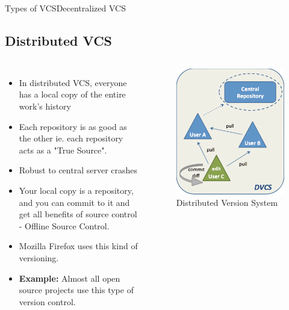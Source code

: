 \documentclass{beamer}
\begin{document}
\begin{frame}{Types of VCS}{Decentralized VCS}
\subsection{Distributed VCS}
\begin{columns}
\begin{itemize}
		  \item {
		    In distributed VCS, everyone has a local copy of the entire work’s history
		  }
		  \item {
		    Each repository is as good as the other ie. each repository acts as a "True Source".
		  }
		  \item{
			Robust to central server crashes
		  }
		  \item{
			Your local copy is a repository, and you can commit to it and get all benefits of source control - Offline Source Control.
		  }	  
		  \item{
			Mozilla Firefox uses this kind of versioning.  
		  }
		  \item{
           \textbf{ Example: }Almost all open source projects use this type of version control.		  
		  }
	  \end{itemize}
\begin{figure}
	 \includegraphics[width=.9\textwidth]{images/dvcs}
	 \caption{Distributed Version System \cite{website}}
 \end{figure}
\end{columns}
\end{frame}	
\end{document}

